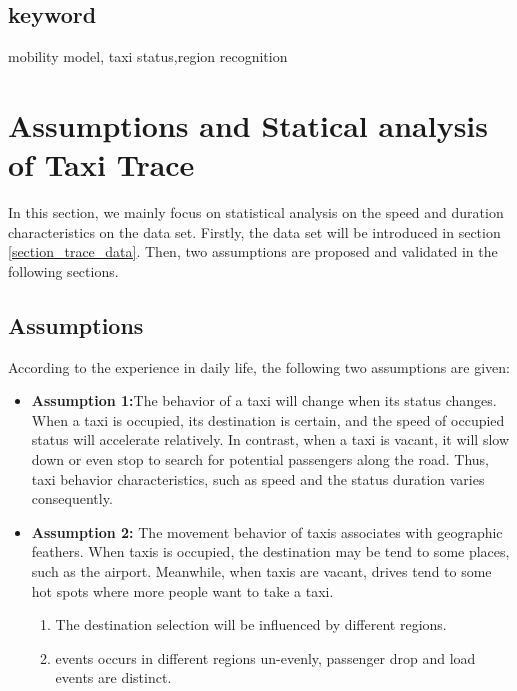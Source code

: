 \documentclass[camera-ready,twocolumn,10pt]{IEEEtran}
\begin{document}
\subsection*{keyword}
mobility model, taxi status,region recognition




\section{Assumptions and Statical analysis of Taxi Trace}
\label{section_assumptions_anlysis}

In this section, we mainly focus on statistical analysis on the speed and duration characteristics on the data set.
Firstly, the data set will be introduced in section \ref{section_trace_data}. Then, two assumptions are proposed and validated in the following sections.



\subsection{Assumptions}
\label{section_statistic_analysis}
According to the experience in daily life, the following two assumptions are given:

\begin{itemize}
  \item \textbf{Assumption 1:}The behavior of a taxi will change when its status changes. When a taxi is occupied, its destination is certain, and the speed of occupied status will accelerate relatively. In contrast, when a taxi is vacant, it will slow down or even stop to search for potential passengers along the road. Thus, taxi behavior characteristics, such as speed and the status duration varies consequently.

  \item \textbf{Assumption 2:} The movement behavior of taxis associates with geographic feathers. When taxis is occupied, the destination may be tend to some places, such as the airport. Meanwhile, when taxis are vacant, drives tend to some hot spots where more people want to take a taxi.
      \begin{enumerate}
        \item The destination selection will be influenced by different regions.
        \item events occurs in different regions un-evenly, passenger drop and load events are distinct.
      \end{enumerate}
\end{itemize}
\end{document}
